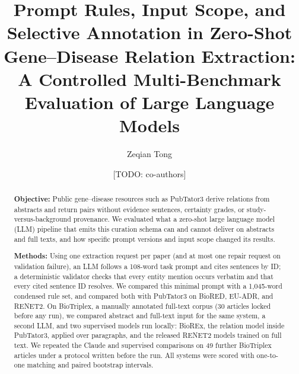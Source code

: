 \documentclass[preprint,10pt,letterpaper]{elsarticle}
\newcommand{\todo}[1]{\textcolor{stneg}{[TODO: #1]}}
\begin{document}
\begin{frontmatter}

\title{Prompt Rules, Input Scope, and Selective Annotation in Zero-Shot Gene--Disease Relation Extraction: A Controlled Multi-Benchmark Evaluation of Large Language Models}

\author[a]{Zeqian Tong}
\author[b]{\todo{co-authors}}
\affiliation[a]{organization={\todo{affiliation}}}
\affiliation[b]{organization={\todo{affiliation}}}

\begin{abstract}
\setlength{\parindent}{0pt}\setlength{\parskip}{6pt}%
\textbf{Objective:} Public gene--disease resources such as PubTator3 derive relations from abstracts and return pairs without evidence sentences, certainty grades, or study-versus-background provenance. We evaluated what a zero-shot large language model (LLM) pipeline that emits this curation schema can and cannot deliver on abstracts and full texts, and how specific prompt versions and input scope changed its results.

\textbf{Methods:} Using one extraction request per paper (and at most one repair request on validation failure), an LLM follows a 108-word task prompt and cites sentences by ID; a deterministic validator checks that every entity mention occurs verbatim and that every cited sentence ID resolves. We compared this minimal prompt with a 1,045-word condensed rule set, and compared both with PubTator3 on BioRED, EU-ADR, and RENET2. On BioTriplex, a manually annotated full-text corpus (30 articles locked before any run), we compared abstract and full-text input for the same system, a second LLM, and two supervised models run locally: BioREx, the relation model inside PubTator3, applied over paragraphs, and the released RENET2 models trained on full text. We repeated the Claude and supervised comparisons on 49 further BioTriplex articles under a protocol written before the run. All systems were scored with one-to-one matching and paired bootstrap intervals.


\end{abstract}
\end{frontmatter}
\end{document}
